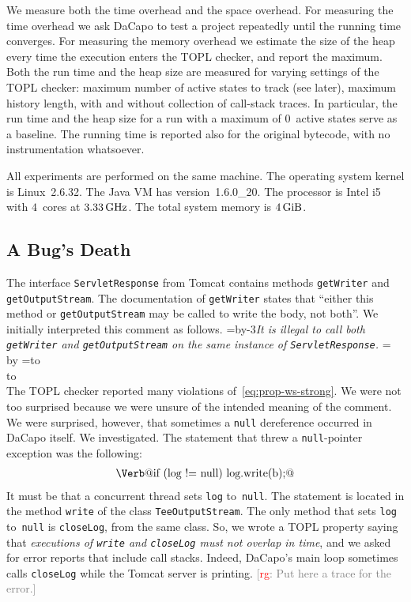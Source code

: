 \documentclass[10pt, preprint]{sigplanconf} %
\newcommand{\noterg}[2]{\textcolor{gray}{[\textcolor{red}{#1}: #2]}}
\newcommand{\rg}[1]{\noterg{rg}{#1}}
\newcommand{\eqquote}[2]{{%
  \refstepcounter{equation}\label{#2}%
  \setbox0=\vbox{\advance\hsize by-3\parindent\noindent\em#1}%
  \newdimen\x\x=\ht0 \advance\x by\dp0%
  \setbox1=\vbox to\x{\vss\hbox{(\arabic{equation})}\vss}%
  \leavevmode\\[1ex]%
  \hbox to\hsize{\hskip 1.5\parindent\box0\hfil\box1}%
  \\[1ex]}}
\begin{document}
We measure both the time overhead and the space overhead.
For measuring the time overhead we ask DaCapo to test a project repeatedly until the running time converges.
For measuring the memory overhead we estimate the size of the heap every time the execution enters the TOPL checker, and report the maximum.
Both the run time and the heap size are measured for varying settings of the TOPL checker: maximum number of active states to track (see later), maximum history length, with and without collection of call-stack traces.
In particular, the run time and the heap size for a run with a maximum of $0$~active states serve as a baseline.
The running time is reported also for the original bytecode, with no instrumentation whatsoever.

All experiments are performed on the same machine.
The operating system kernel is Linux~2.6.32.
The Java VM has version~1.6.0\_20.
The processor is Intel i5 with $4$~cores at $3.33\rm\,GHz$.
The total system memory is $4\rm\,GiB$.

\subsection{A Bug's Death} %

The interface \texttt{ServletResponse} from Tomcat contains methods \texttt{getWriter} and \texttt{getOutputStream}.
The documentation of \texttt{getWriter} states that ``either this method or \texttt{getOutputStream} may be called to write the body, not both''.
We initially interpreted this comment as follows.
\eqquote{It is illegal to call both {\tt getWriter} and {\tt getOutputStream} on the same instance of {\tt ServletResponse}.}{eq:prop-ws-strong}
The TOPL checker reported many violations of~\eqref{eq:prop-ws-strong}.
We were not too surprised because we were unsure of the intended meaning of the comment.
We were surprised, however, that sometimes a {\tt null} dereference occurred in DaCapo itself.
We investigated.
The statement that threw a {\tt null}-pointer exception was the following:
\begin{align}\label{eq:npe-src}
\text{\Verb@if (log != null) log.write(b);@}
\end{align}
It must be that a concurrent thread sets {\tt log} to~{\tt null}.
The statement is located in the method {\tt write} of the class {\tt TeeOutputStream}.
The only method that sets {\tt log} to~{\tt null} is {\tt closeLog}, from the same class.
So, we wrote a TOPL property saying that \textit{executions of {\tt write} and {\tt closeLog} must not overlap in time}, and we asked for error reports that include call stacks.
Indeed, DaCapo's main loop sometimes calls {\tt closeLog} while the Tomcat server is printing.
\rg{Put here a trace for the error.}
\end{document}
